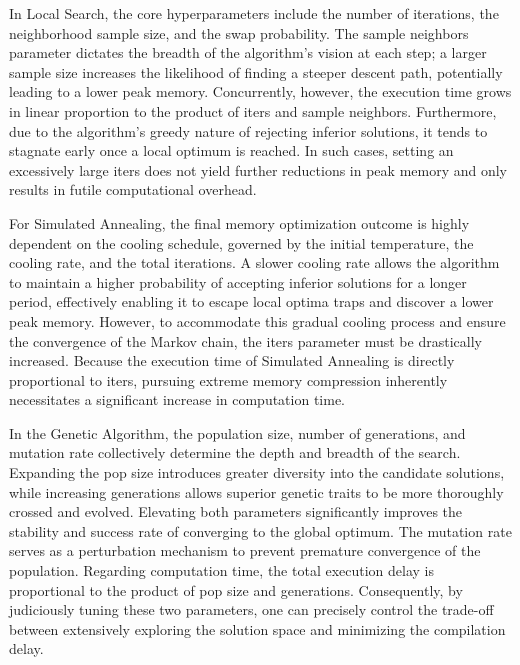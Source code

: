 \singlespacing
In Local Search, the core hyperparameters include the number of iterations, the neighborhood sample size, and the swap probability. The sample neighbors parameter dictates the breadth of the algorithm's vision at each step; a larger sample size increases the likelihood of finding a steeper descent path, potentially leading to a lower peak memory. Concurrently, however, the execution time grows in linear proportion to the product of iters and sample neighbors. Furthermore, due to the algorithm's greedy nature of rejecting inferior solutions, it tends to stagnate early once a local optimum is reached. In such cases, setting an excessively large iters does not yield further reductions in peak memory and only results in futile computational overhead.

For Simulated Annealing, the final memory optimization outcome is highly dependent on the cooling schedule, governed by the initial temperature, the cooling rate, and the total iterations. A slower cooling rate allows the algorithm to maintain a higher probability of accepting inferior solutions for a longer period, effectively enabling it to escape local optima traps and discover a lower peak memory. However, to accommodate this gradual cooling process and ensure the convergence of the Markov chain, the iters parameter must be drastically increased. Because the execution time of Simulated Annealing is directly proportional to iters, pursuing extreme memory compression inherently necessitates a significant increase in computation time.

In the Genetic Algorithm, the population size, number of generations, and mutation rate collectively determine the depth and breadth of the search. Expanding the pop size introduces greater diversity into the candidate solutions, while increasing generations allows superior genetic traits to be more thoroughly crossed and evolved. Elevating both parameters significantly improves the stability and success rate of converging to the global optimum. The mutation rate serves as a perturbation mechanism to prevent premature convergence of the population. Regarding computation time, the total execution delay is proportional to the product of pop size and generations. Consequently, by judiciously tuning these two parameters, one can precisely control the trade-off between extensively exploring the solution space and minimizing the compilation delay.
